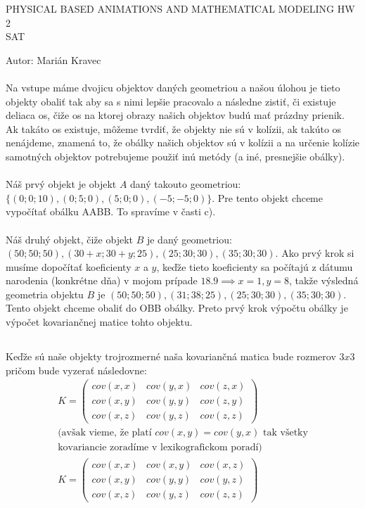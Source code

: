 \documentclass[a4paper]{article}
\begin{document}
 
	
	\pagestyle{plain}
	
	\begin{center}
		\sc\large
		PHYSICAL BASED ANIMATIONS AND MATHEMATICAL MODELING HW 2 
		\\
		SAT 
	\end{center}
	
	Autor: Marián Kravec
	\\
	\\
	Na vstupe máme dvojicu objektov daných geometriou a našou úlohou je tieto objekty obaliť tak aby sa s nimi lepšie pracovalo a následne zistiť, či existuje deliaca os, čiže os na ktorej obrazy našich objektov budú mať prázdny prienik. Ak takáto os existuje, môžeme tvrdiť, že objekty nie sú v kolízii, ak takúto os nenájdeme, znamená to, že obálky našich objektov sú v kolízii a na určenie kolízie samotných objektov potrebujeme použiť inú metódy (a iné, presnejšie obálky).
	\\
	\\
	Náš prvý objekt je objekt $A$ daný takouto geometriou: $\{(0;0;10), (0;5;0), (5;0;0), (-5;-5;0)\}$. Pre tento objekt chceme  vypočítať obálku AABB. To spravíme v časti c).
	\\
	\\
	Náš druhý objekt, čiže objekt $B$ je daný geometriou: ${(50;50;50), (30+x;30+y;25), (25;30;30), (35;30;30)}$. Ako prvý krok si musíme dopočítať koeficienty $x$ a $y$, keďže tieto koeficienty sa počítajú z dátumu narodenia (konkrétne dňa) v mojom prípade $18.9 \implies x=1, y=8$, takže výsledná geometria objektu $B$ je ${(50;50;50), (31;38;25), (25;30;30), (35;30;30)}$. Tento objekt chceme obaliť do OBB obálky. Preto prvý krok výpočtu obálky je výpočet kovariančnej matice tohto objektu.
	
	\subsection{}
	Keďže sú naše objekty trojrozmerné naša kovariančná matica bude rozmerov $3x3$ pričom bude vyzerať následovne:
	\begin{align*}
		K = \begin{pmatrix}
			cov(x,x) & cov(y,x) & cov(z,x) \\
			cov(x,y) & cov(y,y) & cov(z,y) \\
			cov(x,z) & cov(y,z) & cov(z,z)
		\end{pmatrix}
		\\
		\text{(avšak vieme, že platí $cov(x,y)=cov(y,x)$ tak všetky}
		\\
		\text{kovariancie zoradíme v lexikografickom poradí)}
		\\
		K = \begin{pmatrix}
			cov(x,x) & cov(x,y) & cov(x,z) \\
			cov(x,y) & cov(y,y) & cov(y,z) \\
			cov(x,z) & cov(y,z) & cov(z,z)
		\end{pmatrix}
	\end{align*}
\end{document}
